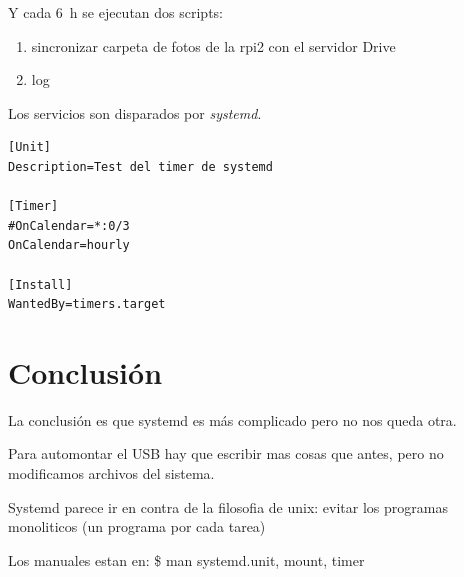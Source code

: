 \documentclass[10pt,a4paper]{article}
\begin{document}
Y cada \SI{6}{h} se ejecutan dos scripts:
\begin{enumerate}
    \item sincronizar carpeta de fotos de la rpi2 con el servidor Drive
    \item log
\end{enumerate}

Los servicios son disparados por \emph{systemd}.

\begin{scriptsize}
\begin{mdframed}
\begin{verbatim}
[Unit]
Description=Test del timer de systemd

[Timer]
#OnCalendar=*:0/3
OnCalendar=hourly

[Install]
WantedBy=timers.target
\end{verbatim}
\end{mdframed}
\end{scriptsize}

\section{Conclusi\'on}

La conclusi\'on es que systemd es m\'as complicado pero no nos queda otra.

Para automontar el USB hay que escribir mas cosas que antes, pero no modificamos archivos del sistema.

Systemd parece ir en contra de la filosofia de unix: evitar los programas monoliticos (un programa por cada tarea)

Los manuales estan en: \$ man systemd.{unit, mount, timer}
\end{document}
